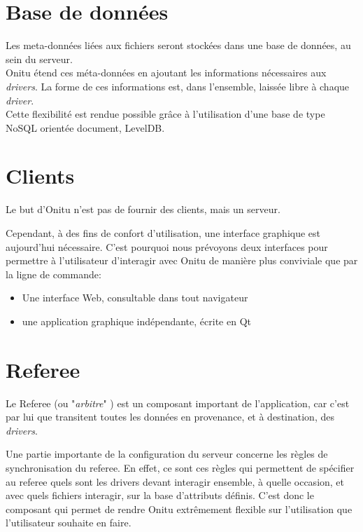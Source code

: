 \section{Base de données}
Les meta-données liées aux fichiers seront stockées dans une base de données, au sein du serveur.\\

Onitu étend ces méta-données en ajoutant les informations nécessaires aux \textit{drivers}. La forme de ces informations est, dans l'ensemble, laissée libre à chaque \textit{driver}.\\

Cette flexibilité est rendue possible grâce à l'utilisation d'une base de type NoSQL orientée document, LevelDB.

\section{Clients}

Le but d'Onitu n'est pas de fournir des clients, mais un serveur.

Cependant, à des fins de confort d'utilisation, une interface graphique est aujourd'hui nécessaire. C'est pourquoi nous prévoyons deux interfaces pour permettre à l'utilisateur d'interagir avec Onitu de manière plus conviviale que par la ligne de commande:
\begin{itemize}
	\item Une interface Web, consultable dans tout navigateur
	\item une application graphique indépendante, écrite en Qt
\end{itemize}

\section{Referee}

Le Referee (ou "\emph{arbitre}" ) est un composant important de l'application, car c'est par lui que transitent toutes les données en provenance, et à destination, des \emph{drivers}.

Une partie importante de la configuration du serveur concerne les règles de synchronisation du referee. En effet, ce sont ces règles qui permettent de spécifier au referee quels sont les drivers devant interagir ensemble, à quelle occasion, et avec quels fichiers interagir, sur la base d'attributs définis. C'est donc le composant qui permet de rendre Onitu extrêmement flexible sur l'utilisation que l'utilisateur souhaite en faire.



